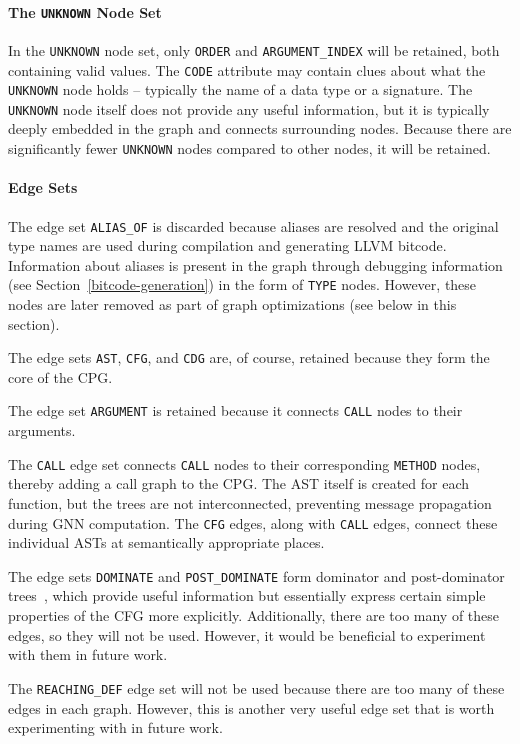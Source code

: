 \paragraph{The \texttt{UNKNOWN} Node Set}
In the \texttt{UNKNOWN} node set, only \texttt{ORDER} and \texttt{ARGUMENT\_INDEX} will be retained, both containing valid values. The \texttt{CODE} attribute may contain clues about what the \texttt{UNKNOWN} node holds -- typically the name of a data type or a signature. The \texttt{UNKNOWN} node itself does not provide any useful information, but it is typically deeply embedded in the graph and connects surrounding nodes. Because there are significantly fewer \texttt{UNKNOWN} nodes compared to other nodes, it will be retained.

\paragraph{Edge Sets}
The edge set \texttt{ALIAS\_OF} is discarded because aliases are resolved and the original type names are used during compilation and generating LLVM bitcode. Information about aliases is present in the graph through debugging information (see Section~\ref{bitcode-generation}) in the form of \texttt{TYPE} nodes. However, these nodes are later removed as part of graph optimizations (see below in this section).

The edge sets \texttt{AST}, \texttt{CFG}, and \texttt{CDG} are, of course, retained because they form the core of the CPG.

The edge set \texttt{ARGUMENT} is retained because it connects \texttt{CALL} nodes to their arguments.

The \texttt{CALL} edge set connects \texttt{CALL} nodes to their corresponding \texttt{METHOD} nodes, thereby adding a call graph to the CPG. The AST itself is created for each function, but the trees are not interconnected, preventing message propagation during GNN computation. The \texttt{CFG} edges, along with \texttt{CALL} edges, connect these individual ASTs at semantically appropriate places.

The edge sets \texttt{DOMINATE} and \texttt{POST\_DOMINATE} form dominator and post-dominator trees~\cite{princeton-dominators}, which provide useful information but essentially express certain simple properties of the CFG more explicitly. Additionally, there are too many of these edges, so they will not be used. However, it would be beneficial to experiment with them in future work.

The \texttt{REACHING\_DEF} edge set will not be used because there are too many of these edges in each graph. However, this is another very useful edge set that is worth experimenting with in future work.

